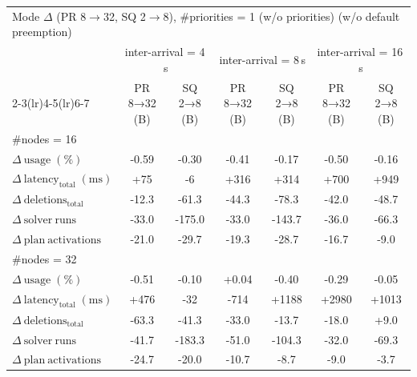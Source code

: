 \begin{tabular}{l c c c c c c}
\toprule
\multicolumn{7}{l}{Mode $\Delta$ (PR 8$\rightarrow$32, SQ 2$\rightarrow$8), \#priorities = 1 (w/o priorities) (w/o default preemption)} \\
\addlinespace[0.2em]
 & \multicolumn{2}{c}{inter-arrival = 4\,s} & \multicolumn{2}{c}{inter-arrival = 8\,s} & \multicolumn{2}{c}{inter-arrival = 16\,s} \\
\cmidrule(lr){2-3}\cmidrule(lr){4-5}\cmidrule(lr){6-7}
 & PR 8→32 (B) & SQ 2→8 (B) & PR 8→32 (B) & SQ 2→8 (B) & PR 8→32 (B) & SQ 2→8 (B) \\
\midrule
\multicolumn{7}{l}{\#nodes = 16} \\
\midrule
$\Delta\ \mathrm{usage}\;(\%)$ & -0.59 & -0.30 & -0.41 & -0.17 & -0.50 & -0.16 \\
$\Delta\ \mathrm{latency}_{\mathrm{total}}\;(\mathrm{ms})$ & +75 & -6 & +316 & +314 & +700 & +949 \\
$\Delta\ \mathrm{deletions}_{\mathrm{total}}$ & -12.3 & -61.3 & -44.3 & -78.3 & -42.0 & -48.7 \\
$\Delta\ \mathrm{solver\ runs}$ & -33.0 & -175.0 & -33.0 & -143.7 & -36.0 & -66.3 \\
$\Delta\ \mathrm{plan\ activations}$ & -21.0 & -29.7 & -19.3 & -28.7 & -16.7 & -9.0 \\
\midrule
\multicolumn{7}{l}{\#nodes = 32} \\
\midrule
$\Delta\ \mathrm{usage}\;(\%)$ & -0.51 & -0.10 & +0.04 & -0.40 & -0.29 & -0.05 \\
$\Delta\ \mathrm{latency}_{\mathrm{total}}\;(\mathrm{ms})$ & +476 & -32 & -714 & +1188 & +2980 & +1013 \\
$\Delta\ \mathrm{deletions}_{\mathrm{total}}$ & -63.3 & -41.3 & -33.0 & -13.7 & -18.0 & +9.0 \\
$\Delta\ \mathrm{solver\ runs}$ & -41.7 & -183.3 & -51.0 & -104.3 & -32.0 & -69.3 \\
$\Delta\ \mathrm{plan\ activations}$ & -24.7 & -20.0 & -10.7 & -8.7 & -9.0 & -3.7 \\
\bottomrule
\end{tabular}

